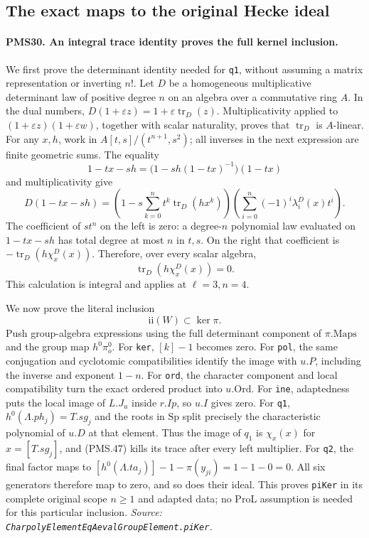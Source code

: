 \subsection{The exact maps to the original Hecke ideal}

\paragraph{PMS30. An integral trace identity proves the full kernel inclusion.}
\label{claim:PMS30}
We first prove the determinant identity needed for \texttt{q1},
without assuming a matrix representation or inverting $n!$.
Let $D$ be a homogeneous multiplicative determinant law of
positive degree $n$ on an algebra over a commutative ring $A$.
In the dual numbers,
$D(1+\varepsilon z)=1+\varepsilon\operatorname{tr}_D(z)$.
Multiplicativity applied to
$(1+\varepsilon z)(1+\varepsilon w)$, together with scalar
naturality, proves that $\operatorname{tr}_D$ is $A$-linear.
For any $x,h$, work in
$A[t,s]/(t^{n+1},s^2)$; all inverses in the next expression
are finite geometric sums.  The equality
\[
 1-tx-sh=\bigl(1-sh(1-tx)^{-1}\bigr)(1-tx)
\]
and multiplicativity give
\[
 D(1-tx-sh)
   =\left(1-s\sum_{k=0}^{n}t^k\operatorname{tr}_D(hx^k)\right)
       \left(\sum_{i=0}^{n}(-1)^i\lambda_i^D(x)t^i\right).
\]
The coefficient of $st^n$ on the left is zero: a degree-$n$
polynomial law evaluated on $1-tx-sh$ has total degree at
most $n$ in $t,s$.
On the right that coefficient is
$-\operatorname{tr}_D(h\chi_x^D(x))$.
Therefore, over every scalar algebra,
\[
             \operatorname{tr}_D(h\chi_x^D(x))=0.             \tag{PMS.47}
\]
This calculation is integral and applies at $\ell=3,n=4$.

We now prove the literal inclusion
\[
                  \mathrm{ii}(W)\subset\ker\pi.              \tag{PMS.48}
\]
Push group-algebra expressions using the full determinant
component of $\pi.\mathrm{Maps}$ and the group map
$h^0\pi_o^0$.
For \texttt{ker}, $[k]-1$ becomes zero.
For \texttt{pol}, the same conjugation and cyclotomic
compatibilities identify the image with $u.P$, including
the inverse and exponent $1-n$.
For \texttt{ord}, the character component and local
compatibility turn the exact ordered product into $u.\mathrm{Ord}$.
For \texttt{ine}, adaptedness puts the local image of $L.J_u$
inside $r.Ip$, so $u.I$ gives zero.
For \texttt{q1}, $h^0(\Lambda.ph_j)=T.sg_j$ and the roots
in $\mathrm{Sp}$ split precisely the characteristic polynomial
of $u.D$ at that element.  Thus the image of $q_1$ is
$\chi_x(x)$ for $x=[T.sg_j]$, and (PMS.47) kills its trace
after every left multiplier.
For \texttt{q2}, the final factor maps to
$[h^0(\Lambda.ta_j)]-1-\pi(y_{ji})=1-1-0=0$.
All six generators therefore map to zero, and so does their
ideal.  This proves \texttt{piKer} in its complete original
scope $n\geq1$ and adapted data; no ProL assumption is needed
for this particular inclusion.
\hfill\textit{Source: \texttt{CharpolyElementEqAevalGroupElement.piKer}.}

